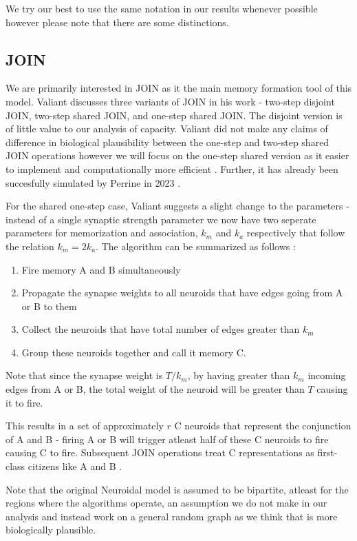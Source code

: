 We try our best to use the same notation in our results whenever possible however please note that there are some distinctions. 

\subsection{JOIN}

We are primarily interested in JOIN as it the main memory formation tool of this model. Valiant discusses three variants of JOIN in his work - two-step disjoint JOIN, two-step shared JOIN, and one-step shared JOIN. The disjoint version is of little value to our analysis of capacity. Valiant did not make any claims of difference in biological plausibility between the one-step and two-step shared JOIN operations however we will focus on the one-step shared version as it easier to implement and computationally more efficient \cite{valiant2005memorization}. Further, it has already been succesfully simulated by Perrine in 2023 \cite{perrine2023neural}. 

For the shared one-step case, Valiant suggests a slight change to the parameters - instead of a single synaptic strength parameter we now have two seperate parameters for memorization and association, $k_m$ and $k_a$ respectively that follow the relation $k_m = 2 k_a$. The algorithm can be summarized as follows \cite{valiant2005memorization}:
\begin{enumerate}
    \item Fire memory A and B simultaneously
    \item Propagate the synapse weights to all neuroids that have edges going from A or B to them
    \item Collect the neuroids that have total number of edges greater than $k_m$
    \item Group these neuroids together and call it memory C. 
\end{enumerate}
Note that since the synapse weight is $T/k_m$, by having greater than $k_m$ incoming edges from A or B, the total weight of the neuroid will be greater than $T$ causing it to fire.  

This results in a set of approximately $r$ C neuroids that represent the conjunction of A and B - firing A or B will trigger atleast half of these C neuroids to fire causing C to fire. Subsequent JOIN operations treat C representations as first-class citizens like A and B \cite{valiant2005memorization}.

Note that the original Neuroidal model is assumed to be bipartite, atleast for the regions where the algorithms operate, an assumption we do not make in our analysis and instead work on a general random graph as we think that is more biologically plausible. 


